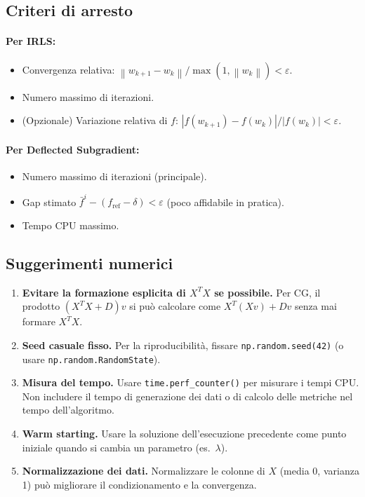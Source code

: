 \documentclass[a4paper,11pt]{article}
\newcommand{\norm}[1]{\left\lVert #1 \right\rVert}
\begin{document}
\subsection{Criteri di arresto}

\paragraph{Per IRLS:}
\begin{itemize}[nosep]
  \item Convergenza relativa: $\norm{w_{k+1} - w_k} / \max(1, \norm{w_k}) < \varepsilon$.
  \item Numero massimo di iterazioni.
  \item (Opzionale) Variazione relativa di $f$: $|f(w_{k+1}) - f(w_k)| / |f(w_k)| < \varepsilon$.
\end{itemize}

\paragraph{Per Deflected Subgradient:}
\begin{itemize}[nosep]
  \item Numero massimo di iterazioni (principale).
  \item Gap stimato $\bar{f}^i - (f_{\text{ref}} - \delta) < \varepsilon$ (poco affidabile in pratica).
  \item Tempo CPU massimo.
\end{itemize}

\subsection{Suggerimenti numerici}

\begin{enumerate}
  \item \textbf{Evitare la formazione esplicita di $X^TX$ se possibile.} Per CG, il prodotto $(X^TX + D)v$ si può calcolare come $X^T(Xv) + Dv$ senza mai formare $X^TX$.

  \item \textbf{Seed casuale fisso.} Per la riproducibilità, fissare \texttt{np.random.seed(42)} (o usare \texttt{np.random.RandomState}).

  \item \textbf{Misura del tempo.} Usare \texttt{time.perf\_counter()} per misurare i tempi CPU. Non includere il tempo di generazione dei dati o di calcolo delle metriche nel tempo dell'algoritmo.

  \item \textbf{Warm starting.} Usare la soluzione dell'esecuzione precedente come punto iniziale quando si cambia un parametro (es.\ $\lambda$).

  \item \textbf{Normalizzazione dei dati.} Normalizzare le colonne di $X$ (media 0, varianza 1) può migliorare il condizionamento e la convergenza.
\end{enumerate}
\end{document}
